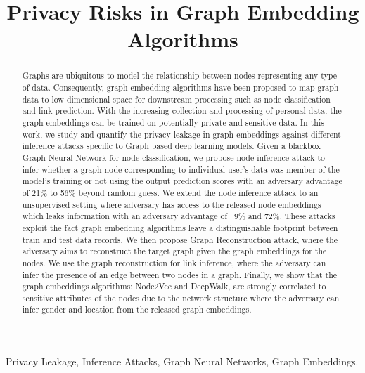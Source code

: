 \documentclass[conference]{IEEEtran}
\begin{document}

\title{Privacy Risks in Graph Embedding Algorithms}


\author{
}




\maketitle

\begin{abstract}
Graphs are ubiquitous to model the relationship between nodes representing any type of data.
Consequently, graph embedding algorithms have been proposed to map graph data to low dimensional space for downstream processing such as node classification and link prediction.
With the increasing collection and processing of personal data, the graph embeddings can be trained on potentially private and sensitive data.
In this work, we study and quantify the privacy leakage in graph embeddings against different inference attacks specific to Graph based deep learning models.
Given a blackbox Graph Neural Network for node classification, we propose node inference attack to infer whether a graph node corresponding to individual user's data was member of the model's training or not using the output prediction scores with an adversary advantage of 21\% to 56\% beyond random guess.
We extend the node inference attack to an unsupervised setting where adversary has access to the released node embeddings which leaks information with an adversary advantage of ~9\% and 72\%.
These attacks exploit the fact graph embedding algorithms leave a distinguishable footprint between train and test data records.
We then propose Graph Reconstruction attack, where the adversary aims to reconstruct the target graph given the graph embeddings for the nodes.
We use the graph reconstruction for link inference, where the adversary can infer the presence of an edge between two nodes in a graph.
Finally, we show that the graph embeddings algorithms: Node2Vec and DeepWalk, are strongly correlated to sensitive attributes of the nodes due to the network structure where the adversary can infer gender and location from the released graph embeddings.
\end{abstract}

\begin{IEEEkeywords}
Privacy Leakage, Inference Attacks, Graph Neural Networks, Graph Embeddings.
\end{IEEEkeywords}









{\footnotesize


}
\end{document}
